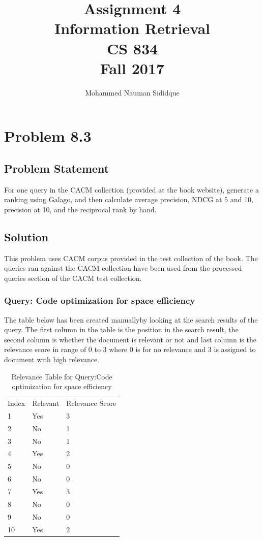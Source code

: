 \documentclass[12pt]{report}
\author{Mohammed Nauman Sididque}
\title{Assignment 4 \\Information Retrieval \\ CS 834 \\ Fall 2017 }
\begin{document}
\maketitle
\tableofcontents
\chapter{Problem 8.3}
\section{Problem Statement}
For one query in the CACM collection (provided at the book website), generate a ranking using Galago, and then calculate average precision, NDCG at 5 and 10, precision at 10, and the reciprocal rank by hand.
\section{Solution}
This problem uses CACM corpus provided in the test collection of the book. The queries ran against the CACM collection have been used from the processed queries section of the CACM test collection.\\

\subsection{Query: Code optimization for space efficiency}
The table below has been created manuallyby looking at the search results of the query. The first column in the table is the position in the search result,  the second column is whether the document is relevant or not and last column is the relevance score in range of 0 to 3 where 0 is for no relevance and 3 is assigned to document with high relevance.

\begin{table}[]
\centering
\caption{Relevance Table for Query:Code optimization for space efficiency }
\label{my-label}
\begin{tabular}{lll}
Index & Relevant & Relevance Score \\
1     & Yes      & 3               \\
2     & No       & 1               \\
3     & No       & 1               \\
4     & Yes      & 2               \\
5     & No       & 0               \\
6     & No       & 0               \\
7     & Yes      & 3               \\
8     & No       & 0               \\
9     & No       & 0               \\
10    & Yes      & 2              
\end{tabular}
\end{table} 
\end{document}
